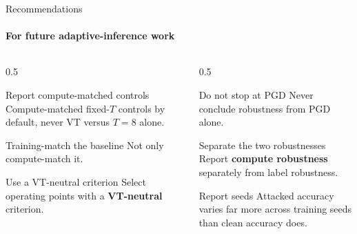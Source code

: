 \documentclass[aspectratio=169,11pt]{beamer}
\newcommand{\FIX}[1]{\textcolor{cfixed}{#1}}
\begin{document}
\begin{frame}{Recommendations}\framesubtitle{For future adaptive-inference work}
\small
\begin{columns}[T]
\begin{column}{0.5\textwidth}
\begin{block}{Report compute-matched controls}
\FIX{Compute-matched} fixed-$T$ controls by default, never VT versus $T=8$ alone.
\end{block}
\vspace{0.3em}
\begin{block}{Training-match the baseline}
Not only compute-match it.
\end{block}
\vspace{0.3em}
\begin{block}{Use a VT-neutral criterion}
Select operating points with a \textbf{VT-neutral} criterion.
\end{block}
\end{column}
\begin{column}{0.5\textwidth}
\begin{block}{Do not stop at PGD}
Never conclude robustness from PGD alone.
\end{block}
\vspace{0.3em}
\begin{block}{Separate the two robustnesses}
Report \textbf{compute robustness} separately from label robustness.
\end{block}
\vspace{0.3em}
\begin{block}{Report seeds}
Attacked accuracy varies far more across training seeds than clean accuracy does.
\end{block}
\end{column}
\end{columns}
\end{frame}
\end{document}
